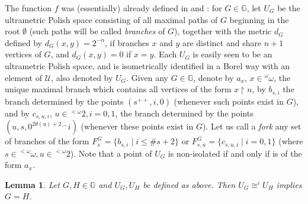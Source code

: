 \documentclass{amsart}
\newtheorem{lemma}[theorem]{Lemma}
\theoremstyle{definition}
\theoremstyle{remark}
\begin{document}
The function $f$ was (essentially) already defined in \cite{louros} and \cite{FriMot}:
for $G \in {\mathbb{G}}$, let $U_G$ be the ultrametric Polish space consisting
of all maximal paths of $G$ beginning in the root $\emptyset$ (such
paths will be called \emph{branches} of $G$),
together with the metric $d_G$ defined by $d_G(x,y) = 2^{-n}$, if
branches $x$ and $y$ are distinct and share $n+1$ vertices of $G$, and
$d_G(x,y) = 0$ if $x=y$. Each $U_G$ is easily seen to be an
ultrametric Polish
space, and is isometrically identified in a Borel
way with an element of $\mathcal{U}$, also denoted by $U_G$. Given any $G \in {\mathbb{G}}$, denote by $a_x$, $x \in {}^\omega \omega$, the
 unique maximal branch which contains all vertices of the form $x
 \restriction n$, by $b_{s, i}$ the branch determined by the points
 $(s^{++},i,0)$ (whenever such points exist in $G$), and by
 $c_{s,u,i}$, $u \in {}^{< \omega} 2, i = 0,1$, the branch determined
 by the points $(u,s,0^{2 \theta(u) +2} {}^\smallfrown i)$ (whenever
 these points exist in $G$). Let us call a \emph{fork} any set of
 branches of the form $F^G_s = \{ b_{s, i} \mid i \leq \# s + 2 \}$ or
  $F^G_{s,u} = \{ c_{s,u,i} \mid i = 0,1 \}$ (where $s \in
 {}^{< \omega} \omega, u \in {}^{< \omega}2$). Note that a point of
 $U_G$ is non-isolated if and only if is of the form $a_x$.

\begin{lemma} \label{lemmaisometry1}
Let $G,H \in {\mathbb{G}}$ and $U_G, U_H$ be defined as above. Then
 $U_G \cong^i U_H$ implies $G = H$.
\end{lemma}
\end{document}
